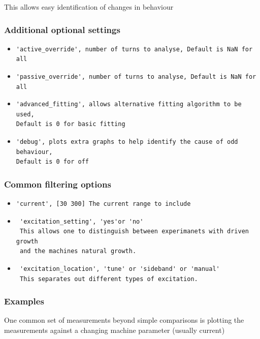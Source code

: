 \documentclass{report}
\begin{document}
This allows easy identification of changes in behaviour 

\subsubsection{Additional optional settings}
\begin{itemize}
    \item{\begin{verbatim}
'active_override', number of turns to analyse, Default is NaN for all
\end{verbatim}
}
    \item{\begin{verbatim}
'passive_override', number of turns to analyse, Default is NaN for all
\end{verbatim}
}
    \item{\begin{verbatim}
'advanced_fitting', allows alternative fitting algorithm to be used, 
Default is 0 for basic fitting 
\end{verbatim}
}
    \item{\begin{verbatim}
'debug', plots extra graphs to help identify the cause of odd behaviour, 
Default is 0 for off
\end{verbatim}
}
\end{itemize}

\subsubsection{Common filtering options}
\begin{itemize}
    \item{\begin{verbatim}
'current', [30 300] The current range to include
\end{verbatim}
}
    \item{\begin{verbatim}
 'excitation_setting', 'yes'or 'no' 
 This allows one to distinguish between experimanets with driven growth
 and the machines natural growth.
\end{verbatim}
}
    \item{\begin{verbatim}
 'excitation_location', 'tune' or 'sideband' or 'manual' 
 This separates out different types of excitation. 
\end{verbatim}
}
\end{itemize}
\subsubsection{Examples}
One common set of measurements beyond simple comparisons is plotting the measurements against a changing machine parameter (usually current) 
\end{document}
